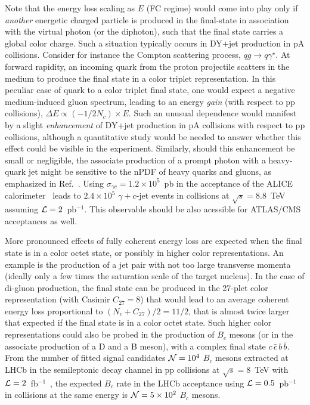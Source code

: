 \documentclass[../report.tex]{subfiles}
\begin{document}
Note that the energy loss scaling as $E$ (FC regime) would come into play only if {\it another} energetic charged particle is produced in the final-state in association with the virtual photon (or the diphoton), such that the final state carries a global color charge. Such a situation typically occurs in DY$+$jet production in pA collisions. Consider for instance the Compton scattering process, $qg \to q\gamma^\star$. At forward rapidity, an incoming quark from the proton projectile scatters in the medium to produce the final state in a color triplet representation. In this peculiar case of quark to a color triplet final state, one would expect a negative medium-induced gluon spectrum, leading to an energy \emph{gain} (with respect to pp collisions), $\Delta E \propto (-1/2N_c)\times E$. Such an unusual dependence would manifest by a slight \emph{enhancement} of DY+jet production in pA collisions with respect to pp collisions, although a quantitative study would be needed to answer whether this effect could be visible in the experiment. Similarly, should this enhancement be small or negligible, the associate production of a prompt photon with a heavy-quark jet might be sensitive to the nPDF of heavy quarks and gluons, as emphasized in Ref.~\cite{Stavreva:2010mw}. Using $\sigma_{\gamma c} = 1.2\times10^5$~pb in the acceptance of the ALICE calorimeter~\cite{Stavreva:2010mw} leads to $2.4\times10^5$ $\gamma+c$-jet events in \pPb collisions at $\sqrt{s}=8.8$~TeV assuming ${\cal L}=2$~pb$^{-1}$. This observable should be also acessible for ATLAS/CMS acceptances as well.  

More pronounced effects of fully coherent energy loss are expected when the final state is in a color octet state, or possibly in higher color representations. An example is the production of a jet pair with not too large transverse momenta (ideally only a few times the saturation scale of the target nucleus). In the case of di-gluon production, the final state can be produced in the 27-plet color representation (with Casimir $C_{27}=8$) that would lead to an average coherent energy loss proportional to $(N_c+C_{27})/2=11/2$, that is almost twice larger that expected if the final state is in a color octet state. Such higher color representations could also be probed in the production of $B_c$ mesons (or in the associate production of a D and a B meson), with a complex final state $c\,\bar{c}\,b\,\bar{b}$. From the number of fitted signal candidates ${\cal N}=10^4$ $B_c$ mesons extracted at LHCb in the semileptonic decay channel in pp collisions at $\sqrt{s}=8$~TeV with ${\cal L}=2$~fb$^{-1}$~\cite{Aaij:2014bva}, the expected $B_c$ rate in the LHCb acceptance using ${\cal L}=0.5$~pb$^{-1}$ in \pPb collisions at the same energy is ${\cal N}=5\times 10^2$ $B_c$ mesons.
\end{document}
